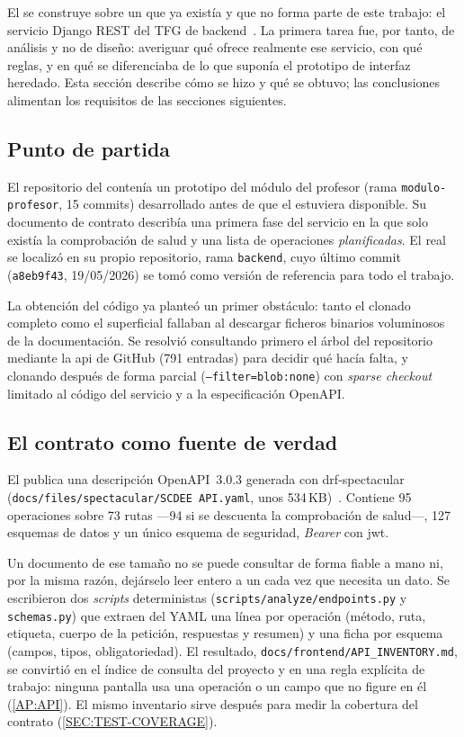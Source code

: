 El  se construye sobre un  que ya existía y que no forma parte
de este trabajo: el servicio Django REST del TFG de backend~\cite{scdee_backend_repo}.
La primera tarea fue, por tanto, de análisis y no de diseño: averiguar qué ofrece realmente
ese servicio, con qué reglas, y en qué se diferenciaba de lo que suponía el prototipo de
interfaz heredado. Esta sección describe cómo se hizo y qué se obtuvo; las conclusiones
alimentan los requisitos de las secciones siguientes.

\subsection{Punto de partida}

El repositorio del  contenía un prototipo del módulo del profesor (rama
\texttt{modulo-profesor}, 15 commits) desarrollado antes de que el  estuviera
disponible. Su documento de contrato describía una primera fase del servicio en la que solo
existía la comprobación de salud y una lista de operaciones \emph{planificadas}. El
 real se localizó en su propio repositorio, rama \texttt{backend}, cuyo último
commit (\texttt{a8eb9f43}, 19/05/2026) se tomó como versión de referencia para todo el
trabajo.

La obtención del código ya planteó un primer obstáculo: tanto el clonado completo como el
superficial fallaban al descargar ficheros binarios voluminosos de la documentación. Se
resolvió consultando primero el árbol del repositorio mediante la \acs{api} de GitHub (791
entradas) para decidir qué hacía falta, y clonando después de forma parcial
(\texttt{--filter=blob:none}) con \textit{sparse checkout} limitado al código del servicio y a
la especificación OpenAPI.

\subsection{El contrato como fuente de verdad}

El  publica una descripción OpenAPI~3.0.3 generada con drf-spectacular
(\texttt{docs/files/spectacular/SCDEE API.yaml}, unos 534\,KB)~\cite{codex_openapi303,codex_drfspectacular}.
Contiene 95 operaciones sobre 73 rutas ---94 si se descuenta la comprobación de salud---,
127 esquemas de datos y un único esquema de seguridad, \textit{Bearer} con \acs{jwt}.

Un documento de ese tamaño no se puede consultar de forma fiable a mano ni, por la misma
razón, dejárselo leer entero a un  cada vez que necesita un dato. Se escribieron
dos \textit{scripts} deterministas (\texttt{scripts/analyze/endpoints.py} y
\texttt{schemas.py}) que extraen del YAML una línea por operación (método, ruta, etiqueta,
cuerpo de la petición, respuestas y resumen) y una ficha por esquema (campos, tipos,
obligatoriedad). El resultado, \texttt{docs/frontend/API\_INVENTORY.md}, se convirtió en el
índice de consulta del proyecto y en una regla explícita de trabajo: ninguna pantalla usa
una operación o un campo que no figure en él (\cref{AP:API}). El mismo inventario sirve
después para medir la cobertura del contrato (\cref{SEC:TEST-COVERAGE}).

